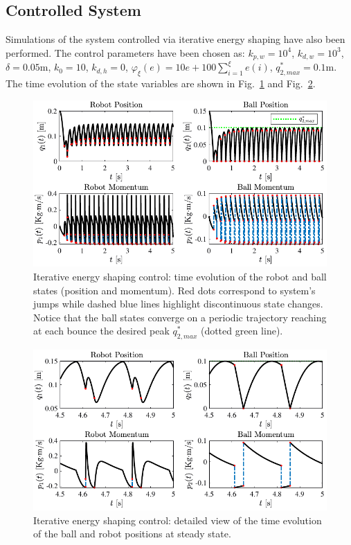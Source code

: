 \subsection{Controlled System}\label{sec:controlled_bd}
%
Simulations of the system controlled via iterative energy shaping have also been performed. The control parameters have been chosen as: $k_{p,w} = 10^4$, $k_{d,w} = 10^3$, $\delta = 0.05$m, $k_0 = 10$, $k_{d,h} = 0$, $\varphi_\xi(e) = 10e + 100\sum_{i = 1}^{\xi}e(i)$, $q_{2,max}^* = 0.1$m. The time evolution of the state variables are shown in Fig.~\ref{fig:ctrl1} and Fig.~\ref{fig:ctrl1_det}.
%
\begin{figure}[hb!]
	\centering
	\includegraphics[width=\linewidth]{Figures/ctrl1.pdf}
	\caption[Iterative energy shaping control: time evolution of the robot and ball states]{Iterative energy shaping control: time evolution of the robot and ball states (position and momentum). Red dots correspond to system's jumps while dashed blue lines highlight discontinuous state changes. Notice that the ball states converge on a periodic trajectory reaching at each bounce the desired peak $q^*_{2,max}$ (dotted green line).}
	\label{fig:ctrl1}
\end{figure}
%
%
\begin{figure}[!ht]
	\centering
	\includegraphics[width=\linewidth]{Figures/ctrl1_det.pdf}
	\caption[Iterative energy shaping control: detailed view of the time evolution of the ball and robot positions at steady state]{Iterative energy shaping control: detailed view of the time evolution of the ball and robot positions at steady state.}
	\label{fig:ctrl1_det}
\end{figure}
